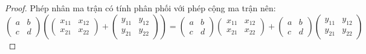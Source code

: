 \begin{proof}
    Phép nhân ma trận có tính phân phối với phép cộng ma trận nên:
    \[
        \begin{pmatrix}
            a & b \\
            c & d
        \end{pmatrix}
        \left(
        \begin{pmatrix}
                x_{11} & x_{12} \\
                x_{21} & x_{22}
            \end{pmatrix}
        +
        \begin{pmatrix}
                y_{11} & y_{12} \\
                y_{21} & y_{22}
            \end{pmatrix}
        \right)
        =
        \begin{pmatrix}
            a & b \\
            c & d
        \end{pmatrix}
        \begin{pmatrix}
            x_{11} & x_{12} \\
            x_{21} & x_{22}
        \end{pmatrix}
        +
        \begin{pmatrix}
            a & b \\
            c & d
        \end{pmatrix}
        \begin{pmatrix}
            y_{11} & y_{12} \\
            y_{21} & y_{22}
        \end{pmatrix}
    \]
    

\end{proof}
